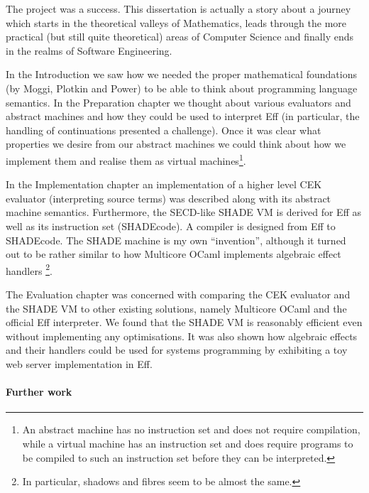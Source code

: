 \documentclass[class=article, crop=false]{standalone}
\begin{document}

The project was a success. This dissertation is actually a story about a journey
which starts in the theoretical valleys of Mathematics, leads through the more
practical (but still quite theoretical) areas of Computer Science and finally
ends in the realms of Software Engineering.


In the Introduction we saw how we needed the proper mathematical foundations
(by Moggi, Plotkin and Power) to be able to think about programming language
semantics. In the Preparation chapter we thought about various evaluators and
abstract machines and how they could be used to interpret Eff (in particular,
the handling of continuations presented a challenge). Once it was clear what
properties we desire from our abstract machines we could think about how we
implement them and realise them as virtual machines\footnote{An abstract machine
has no instruction set and does not require compilation, while a virtual machine
has an instruction set and does require programs to be compiled to such an
instruction set before they can be interpreted.}.

In the Implementation chapter an implementation of a higher level CEK evaluator
(interpreting source terms) was described along with its abstract machine
semantics. Furthermore, the SECD-like SHADE VM is derived for Eff as well as
its instruction set (SHADEcode). A compiler is designed from Eff to SHADEcode.
The SHADE machine is my own ``invention'', although it turned out to be rather
similar to how Multicore OCaml implements algebraic effect handlers
\footnote{In particular, shadows and fibres seem to be almost the same.}.

The Evaluation chapter was concerned with comparing the CEK evaluator and the
SHADE VM to other existing solutions, namely Multicore OCaml and the official
Eff interpreter. We found that the SHADE VM is reasonably efficient even without
implementing any optimisations. It was also shown how algebraic effects and
their handlers could be used for systems programming by exhibiting a toy web
server implementation in Eff.

\paragraph{Further work}
\end{document}
